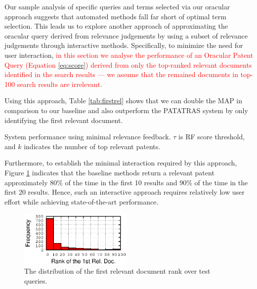 Our sample analysis of specific queries and terms selected via our oracular
approach suggests that automated methods fall far short of optimal term selection.
This leads us to explore another approach of approximating the oracular query
derived from relevance judgements by using a subset of relevance judgements
through interactive methods.  Specifically, to minimize the need for user interaction,
\textcolor{red}{in this section we analyse the performance of an Oracular Patent Query (Equation \ref{eq:score}) derived from
only the top-ranked relevant documents identified in the search results --- we assume that the remained documents in top-100 search results are irrelevant.}

Using this approach, Table \ref{tab:firstrel} shows that we can double the MAP in comparison to our baseline and also outperform the PATATRAS system by only identifying the first relevant document.
\begin{table}[t!]
  \begin{center}
   \caption{System performance using minimal relevance feedback. $\tau$ is RF score threshold, and $k$ indicates the number of top relevant patents.}\vspace{3mm}
     
  \label{tab:firstrel}
  \end{center}  
\end{table}

Furthermore, to establish the minimal interaction required by this
approach, Figure \ref{fig:FirstTPRankHisto} indicates that the
baseline methods return a relevant patent approximately 80\% of the
time in the first 10 results and 90\% of the time in the first 20
results. Hence, such an interactive approach requires relatively low
user effort while achieving state-of-the-art performance.


\begin{figure}
\begin{centering}
\includegraphics[width=5.5cm]{imgs/1stRank}
\par\end{centering}

\protect\caption{The distribution of the first relevant document rank over test queries.}
\label{fig:FirstTPRankHisto}
\end{figure}



